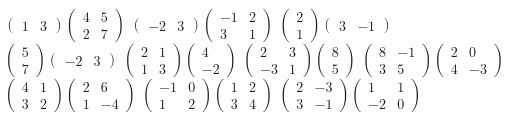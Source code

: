 $\begin{pmatrix} 1 & 3 \end{pmatrix}\begin{pmatrix} 4 & 5 \\ 2 & 7 \end{pmatrix}$
 $\begin{pmatrix} -2 & 3 \end{pmatrix}\begin{pmatrix} -1 & 2 \\ 3 & 1 \end{pmatrix}$
 $\begin{pmatrix} 2 \\ 1 \end{pmatrix}\begin{pmatrix} 3 & -1 \end{pmatrix}$
 $\begin{pmatrix} 5 \\ 7 \end{pmatrix}\begin{pmatrix} -2 & 3 \end{pmatrix}$
 $\begin{pmatrix} 2 & 1 \\ 1 & 3 \end{pmatrix}\begin{pmatrix} 4 \\ -2 \end{pmatrix}$
 $\begin{pmatrix} 2 & 3 \\ -3 & 1 \end{pmatrix}\begin{pmatrix} 8 \\ 5 \end{pmatrix}$
 $\begin{pmatrix} 8 & -1 \\ 3 & 5 \end{pmatrix}\begin{pmatrix} 2 & 0 \\ 4 & -3 \end{pmatrix}$
 $\begin{pmatrix} 4 & 1 \\ 3 & 2 \end{pmatrix}\begin{pmatrix} 2 & 6 \\ 1 & -4 \end{pmatrix}$
 $\begin{pmatrix} -1 & 0 \\ 1 & 2 \end{pmatrix}\begin{pmatrix} 1 & 2 \\ 3 & 4 \end{pmatrix}$
 $\begin{pmatrix} 2 & -3 \\ 3 & -1 \end{pmatrix}\begin{pmatrix} 1 & 1 \\ -2 & 0 \end{pmatrix}$
